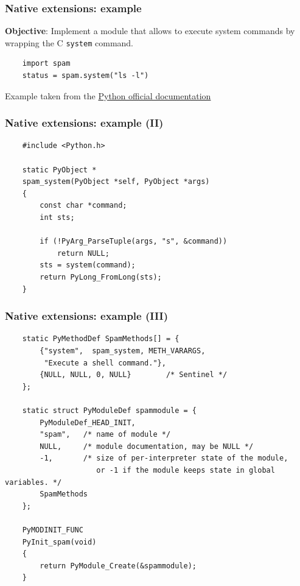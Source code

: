 \documentclass[handout]{beamer}
\begin{document}
\begin{frame}[fragile]
  \frametitle{Native extensions: example}

  \textbf{Objective}: Implement a module that allows to execute system commands
  by wrapping the C \texttt{system} command.

  \begin{verbatim}
    import spam
    status = spam.system("ls -l")
  \end{verbatim}

  \tiny Example taken from the
  \href{https://docs.python.org/3/extending/extending.html#a-simple-example}{Python
  official documentation}
\end{frame}

\begin{frame}[fragile]
  \frametitle{Native extensions: example (II)}

  \begin{verbatim}
    #include <Python.h>

    static PyObject *
    spam_system(PyObject *self, PyObject *args)
    {
        const char *command;
        int sts;

        if (!PyArg_ParseTuple(args, "s", &command))
            return NULL;
        sts = system(command);
        return PyLong_FromLong(sts);
    }
  \end{verbatim}
\end{frame}

\begin{frame}[fragile]
  \frametitle{Native extensions: example (III)}

  \begin{verbatim}
    static PyMethodDef SpamMethods[] = {
        {"system",  spam_system, METH_VARARGS,
         "Execute a shell command."},
        {NULL, NULL, 0, NULL}        /* Sentinel */
    };

    static struct PyModuleDef spammodule = {
        PyModuleDef_HEAD_INIT,
        "spam",   /* name of module */
        NULL,     /* module documentation, may be NULL */
        -1,       /* size of per-interpreter state of the module,
                     or -1 if the module keeps state in global variables. */
        SpamMethods
    };

    PyMODINIT_FUNC
    PyInit_spam(void)
    {
        return PyModule_Create(&spammodule);
    }
  \end{verbatim}
\end{frame}
\end{document}
